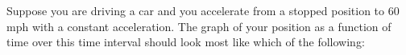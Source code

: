 \documentclass{ximera}
\newcommand{\recommendation}[1]{}
\begin{document}
\begin{problem}
  \recommendation{Elizabeth}

  Suppose you are driving a car and you accelerate from a stopped
  position to 60 mph with a constant acceleration.  The graph of your
  position as a function of time over this time interval should look
  most like which of the following:
  \begin{multipleChoice}

\end{multipleChoice}
\end{problem}
\end{document}
